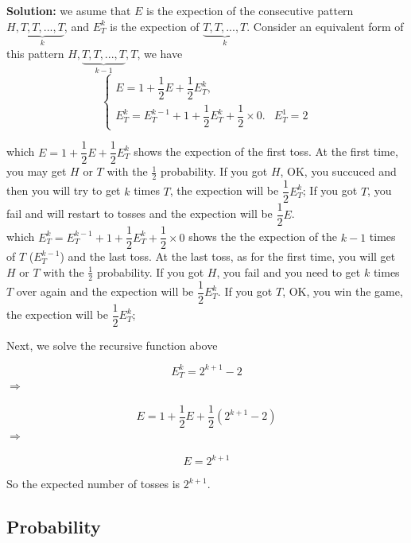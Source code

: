 \documentclass[a4paper]{article}
\begin{document}
\textbf{Solution:} we asume that $E$ is the expection of the consecutive pattern $H,\underbrace{T,T,...,T}_{k}$, and $E_{T}^{k}$ is the   expection of $\underbrace{T,T,...,T}_{k}$. Consider an equivalent form of this pattern $H,\underbrace{T,T,...,T}_{k-1},T$, we have 
\begin{equation}  
\left\{  
             \begin{array}{lr}  
             E = 1 + \dfrac{1}{2}E +  \dfrac{1}{2}E_{T}^{k}, &  \\  
             E_{T}^{k} = E_{T}^{k-1} + 1 + \dfrac{1}{2}E_{T}^{k} + \dfrac{1}{2} \times 0. &   E_{T}^{1} =2   
             \end{array}  
\right.  
\end{equation}  

which $E = 1 + \dfrac{1}{2}E +  \dfrac{1}{2}E_{T}^{k}$ shows the expection of the first toss. At the first time, you may get $H$ or $T$ with the  $\frac{1}{2}$ probability. If you got $H$, OK, you succuced and then you will try to get $k$ times $T$, the expection will be $\dfrac{1}{2}E_{T}^{k}$; If you got $T$, you fail and will restart to tosses and the expection will be $\dfrac{1}{2}E$. \\
which $ E_{T}^{k} = E_{T}^{k-1} + 1 + \dfrac{1}{2}E_{T}^{k} + \dfrac{1}{2} \times 0$ shows the the expection of the $k-1$ times of $T$ ($E_{T}^{k-1}$) and the last toss. At the last toss, as for the first time, you will get $H$ or $T$ with the  $\frac{1}{2}$ probability. If you got $H$, you fail and you need to get $k$ times $T$ over again and the expection will be $\dfrac{1}{2}E_{T}^{k}$. If you got $T$, OK, you win the game, the expection will be $\dfrac{1}{2}E_{T}^{k}$; 

Next, we solve the recursive function above

\begin{equation}  
    E_{T}^{k} = 2^{k+1} -2
\end{equation} 
$\Rightarrow$

\begin{equation}  
    E = 1 + \dfrac{1}{2}E +  \dfrac{1}{2} (2^{k+1} -2)
\end{equation} 
$\Rightarrow$

\begin{equation}  
    E  =  2^{k+1}
\end{equation} 

So the expected number of tosses is $2^{k+1}$.


\subsection{Probability}
\end{document}
